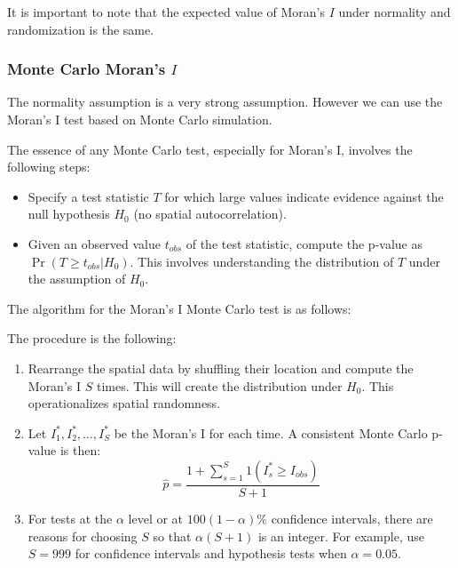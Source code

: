 It is important to note that the expected value of Moran's $I$ under normality and randomization is the same. 

\subsubsection{Monte Carlo Moran's $I$}

The normality assumption is a very strong assumption. However we can use the Moran’s I test based on Monte Carlo simulation.

The essence of any Monte Carlo test, especially for Moran's I, involves the following steps: 

\begin{itemize}
  \item Specify a test statistic $T$ for which large values indicate evidence against the null hypothesis $H_0$ (no spatial autocorrelation).
  \item  Given an observed value $t_{obs}$ of the test statistic, compute the p-value as $\Pr(T\geq t_{obs}|H_0)$. This involves understanding the distribution of $T$ under the assumption of $H_0$.
\end{itemize}

The algorithm for the Moran's I Monte Carlo test is as follows:

\begin{algorithm}
The procedure is the following:
\begin{enumerate}
\item Rearrange the spatial data by shuffling their location and compute the Moran's I $S$ times. This will create the distribution under $H_0$. This operationalizes spatial randomness. 
\item Let $I_1^*, I_2^*,\ldots, I_S^*$ be the Moran's I for each time. A consistent Monte Carlo p-value is then:
  \begin{equation*}
    \widehat{p} = \frac{1 + \sum_{s=1}^S 1(I^*_s \geq I_{obs})}{S + 1}
  \end{equation*}
  \item For tests at the $\alpha$ level or at $100(1- \alpha)\%$ confidence intervals, there are reasons for choosing $S$ so that $\alpha(S + 1)$ is an integer. For example, use $S=999$ for confidence intervals and hypothesis tests when $\alpha = 0.05$.
\end{enumerate}
\end{algorithm}

